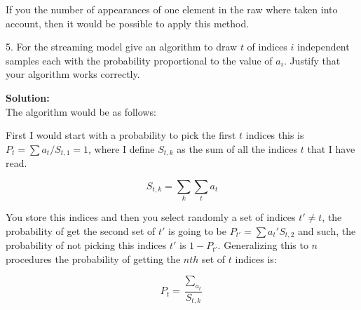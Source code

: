 \documentclass[14pt]{article}
\begin{document}
If you the number of appearances of one element in the raw where taken
into account, then it would be possible to apply this method.


\begin{mdframed}
5. For the streaming model give an algorithm to draw $t$ of indices $i$
independent samples each with the probability proportional to the
value of $a_i$. Justify that your algorithm works correctly.
\end{mdframed}


\textbf{Solution:}\\

The algorithm would be as follows:


First I would start with a probability to pick the first $t$ indices
this is $P_t = \sum{a_t}/S_{t,1} = 1$, where I define $S_{t,k}$ as the
sum of all the indices $t$ that I have read.

\begin{equation}
S_{t,k} = \sum_k \sum_t a_t
\end{equation}

You store this indices and then you select randomly a set of indices
$t' \neq t$, the probability of get the second set of $t'$ is going to be
 $P_{t'} = \sum{a_{t}'}{S_{t,2}}$ and such, the probability of not
picking this indices $t'$ is $1-P_{t'}$. Generalizing this to $n$ procedures
the probability of getting the $n th$ set of $t$ indices is:

\begin{equation}
P_t = \dfrac{\sum_{a_t}}{S_{t,k}}
\end{equation}
\end{document}
